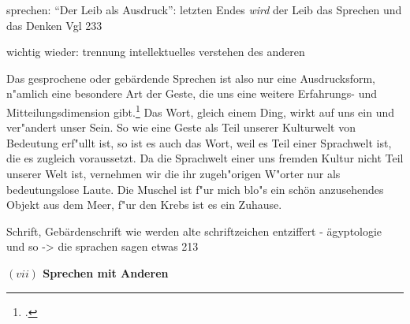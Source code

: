 \documentclass[a4paper, 12pt]{article}
\begin{document}
\begin{onehalfspace}
sprechen: "`Der Leib als Ausdruck"': letzten Endes \emph{wird} der Leib das Sprechen und das Denken Vgl 233

wichtig wieder: trennung intellektuelles verstehen des anderen

Das gesprochene oder gebärdende Sprechen ist also nur eine Ausdrucksform, n"amlich eine besondere Art der Geste, die uns eine weitere Erfahrungs- und Mitteilungsdimension gibt.\footnote{\cite[Vgl.][S. 216 f.]{merleau1966phanomenologie}.} Das Wort, gleich einem Ding, wirkt auf uns ein und ver"andert unser Sein. So wie eine Geste als Teil unserer Kulturwelt von Bedeutung erf"ullt ist, so ist es auch das Wort, weil es Teil einer Sprachwelt ist, die es zugleich voraussetzt. Da die Sprachwelt einer uns fremden Kultur nicht Teil unserer Welt ist, vernehmen wir die ihr zugeh"origen W"orter nur als bedeutungslose Laute. Die Muschel ist f"ur mich blo"s ein schön anzusehendes Objekt aus dem Meer, f"ur den Krebs ist es ein Zuhause. 

Schrift, Gebärdenschrift
wie werden alte schriftzeichen entziffert - ägyptologie und so
	-> die sprachen sagen etwas 213


\vspace{5mm}

\noindent\textbf{$(vii)$ Sprechen mit Anderen}

\noindent



\end{onehalfspace}
\nocite{*}
%
\printbibliography
\end{document}
